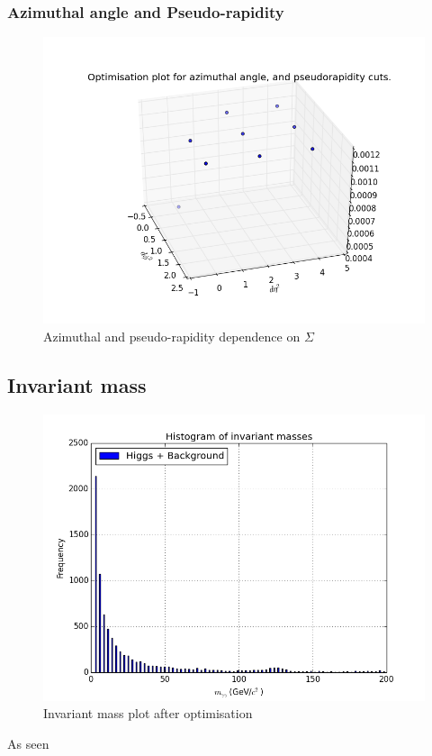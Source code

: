 \documentclass{article}
\begin{document}
\subsubsection{Azimuthal angle and Pseudo-rapidity}
\begin{figure}
\includegraphics[scale=0.5]{etaphi1}
\caption{Azimuthal and pseudo-rapidity dependence on $\Sigma$}
\end{figure}
\subsection{Invariant mass}
\begin{figure}
\includegraphics[scale=0.5]{invariantmass1}
\caption{Invariant mass plot after optimisation}
\end{figure}
As seen 
\end{document}
